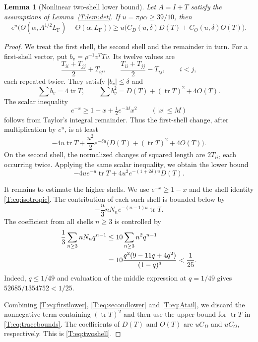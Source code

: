 \documentclass[reqno,english]{amsart}
\newtheorem{lemma}[theorem]{Lemma}
\theoremstyle{definition}
\newtheorem{open problem}[theorem]{Open Problem}
\theoremstyle{remark}
\theoremstyle{plain}
\numberwithin{equation}{section}
\newcommand{\FCC}{L_{\mathrm F}}
\newcommand{\tr}{\operatorname{tr}}
\newcommand{\Th}{\Theta}
\newcommand{\Id}{I}
\begin{document}
\begin{lemma}[Nonlinear two-shell lower bound]\label{T:lem:twoshell}
Let $A=\Id+T$ satisfy the assumptions of Lemma~\ref{T:lem:det}. If $u=\pi\rho\alpha\ge39/10$, then
\begin{equation}\label{T:eq:twoshell}
 e^u\bigl(\Th(\alpha,A^{1/2}\FCC)-\Th(\alpha,\FCC)\bigr)
 \ge u\bigl(C_D(u,\delta)D(T)+C_O(u,\delta)O(T)\bigr).
\end{equation}
\end{lemma}
\begin{proof}
We treat the first shell, the second shell and the remainder in turn.
For a first-shell vector, put $b_v=\rho^{-1}v^TTv$. Its twelve values
are
\[
 \frac{T_{ii}+T_{jj}}2+T_{ij},\qquad
 \frac{T_{ii}+T_{jj}}2-T_{ij},\qquad i<j,
\]
each repeated twice. They satisfy $|b_v|\le\delta$ and
\begin{equation}\label{T:eq:firstmoments}
 \sum b_v=4\tr T,\qquad
 \sum b_v^2=D(T)+(\tr T)^2+4O(T).
\end{equation}
The scalar inequality
\begin{equation}\label{T:eq:scalarquad}
 e^{-x}\ge1-x+\tfrac12e^{-M}x^2\qquad(|x|\le M)
\end{equation}
follows from Taylor's integral remainder. Thus the first-shell change, after multiplication by $e^u$, is at least
\begin{equation}\label{T:eq:firstlower}
 -4u\tr T+\frac{u^2}{2}e^{-\delta u}
       \bigl(D(T)+(\tr T)^2+4O(T)\bigr).
\end{equation}
On the second shell, the normalized changes of squared length are
$2T_{ii}$, each occurring twice. Applying the same scalar inequality,
we obtain the lower bound
\begin{equation}\label{T:eq:secondlower}
 -4ue^{-u}\tr T+4u^2e^{-(1+2\delta)u}D(T).
\end{equation}

It remains to estimate the higher shells. We use
$e^{-x}\ge1-x$ and the shell identity \eqref{T:eq:isotropic}.
The contribution of each such shell is bounded below by
\[
 -\frac{u}{3}nN_n e^{-(n-1)u}\tr T.
\]
The coefficient from all shells $n\ge3$ is controlled by
\begin{align}\label{T:eq:Atail}
 \frac13\sum_{n\ge3}nN_nq^{n-1}
 &\le10\sum_{n\ge3}n^2q^{n-1}\\
 &=10\frac{q^2(9-11q+4q^2)}{(1-q)^3}<\frac1{25}.\notag
\end{align}
Indeed, $q\le1/49$ and evaluation of the middle expression at $q=1/49$ gives $52685/1354752<1/25$.

Combining \eqref{T:eq:firstlower}, \eqref{T:eq:secondlower} and
\eqref{T:eq:Atail}, we discard the nonnegative term containing
$(\tr T)^2$ and then use the upper bound for $\tr T$ in
\eqref{T:eq:tracebounds}. The coefficients of $D(T)$ and $O(T)$
are $uC_D$ and $uC_O$, respectively. This is
\eqref{T:eq:twoshell}.
\end{proof}
\end{document}

